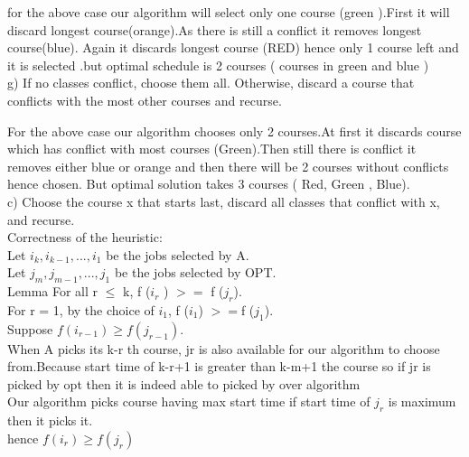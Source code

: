 \documentclass{extarticle}
\theoremstyle{remark}
\begin{document}
for the above case our algorithm will select only one course (green ).First it will discard longest course(orange).As there is still a conflict it removes longest course(blue). Again it discards longest course (RED) hence only 1 course left and it is selected .but optimal schedule is 2 courses ( courses in green and blue )\\

g) If no classes conflict, choose them all. Otherwise, discard a course that
conflicts with the most other courses and recurse.
\newline
\newline
\begin{center}

\end{center}

For the above case our algorithm chooses only 2 courses.At first it discards course which has conflict with most courses (Green).Then still there is conflict it removes either blue or orange and then there will be 2 courses without conflicts hence chosen.
  But optimal solution takes 3 courses ( Red, Green , Blue).\\
  
c) Choose the course x that starts last, discard all classes that conflict
with x, and recurse.\\
Correctness of the  heuristic:\\

Let $ i_k, i_{k-1}, . . . , i_1 $ be the jobs selected by A.\\
Let $ j_m, j_{m-1}, . . . , j_1 $ be the jobs selected by OPT.\\
Lemma
For all r $\leq$ k, f ($i_r$ ) $>=$ f ($j_r$).\\

For r = 1, by the choice of $i_1$, f ($i_1$) $>=$f ($j_1$).\\ 
Suppose $f (i_{r-1}) \geq f (j_{r-1})$.\\

When A picks its k-r th course, jr 
is also available for our algorithm to choose from.Because start time of k-r+1 is greater than k-m+1 the course so if jr is picked by opt then it is indeed able to picked by over algorithm \\
Our algorithm picks course having max start time if start time of $j_r$ is maximum then it picks it.\\
hence $f (i_{r}) \geq f (j_{r})$
\end{document}
